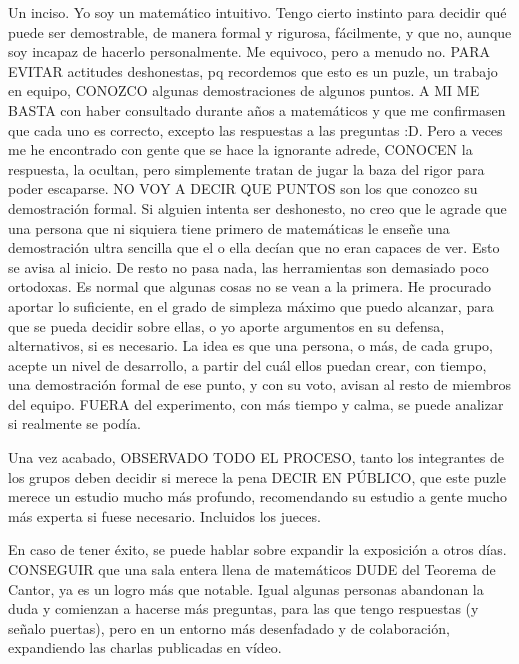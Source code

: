 \noindent
Un inciso. Yo soy un matemático intuitivo. Tengo cierto instinto para decidir qué puede ser demostrable, de manera formal y rigurosa, fácilmente, y que no, aunque soy incapaz de hacerlo personalmente. Me equivoco, pero a menudo no. PARA EVITAR actitudes deshonestas, pq recordemos que esto es un puzle, un trabajo en equipo, CONOZCO algunas demostraciones de algunos puntos. A MI ME BASTA con haber consultado durante años a matemáticos y que me confirmasen que cada uno es correcto, excepto las respuestas a las preguntas :D. Pero a veces me he encontrado con gente que se hace la ignorante adrede, CONOCEN la respuesta, la ocultan, pero simplemente tratan de jugar la baza del rigor para poder escaparse. NO VOY A DECIR QUE PUNTOS son los que conozco su demostración formal. Si alguien intenta ser deshonesto, no creo que le agrade que una persona que ni siquiera tiene primero de matemáticas le enseñe una demostración ultra sencilla que el o ella decían que no eran capaces de ver. Esto se avisa al inicio. De resto no pasa nada, las herramientas son demasiado poco ortodoxas. Es normal que algunas cosas no se vean a la primera. He procurado aportar lo suficiente, en el grado de simpleza máximo que puedo alcanzar, para que se pueda decidir sobre ellas, o yo aporte argumentos en su defensa, alternativos, si es necesario. La idea es que una persona, o más, de cada grupo, acepte un nivel de desarrollo, a partir del cuál ellos puedan crear, con tiempo, una demostración formal de ese punto, y con su voto, avisan al resto de miembros del equipo. FUERA del experimento, con más tiempo y calma, se puede analizar si realmente se podía.


\noindent
Una vez acabado, OBSERVADO TODO EL PROCESO, tanto los integrantes de los grupos deben decidir si merece la pena DECIR EN PÚBLICO, que este puzle merece un estudio mucho más profundo, recomendando su estudio a gente mucho más experta si fuese necesario. Incluidos los jueces.

\noindent
En caso de tener éxito, se puede hablar sobre expandir la exposición a otros días. CONSEGUIR que una sala entera llena de matemáticos DUDE del Teorema de Cantor, ya es un logro más que notable. Igual algunas personas abandonan la duda y comienzan a hacerse más preguntas, para las que tengo respuestas (y señalo puertas), pero en un entorno más desenfadado y de colaboración, expandiendo las charlas publicadas en vídeo.

